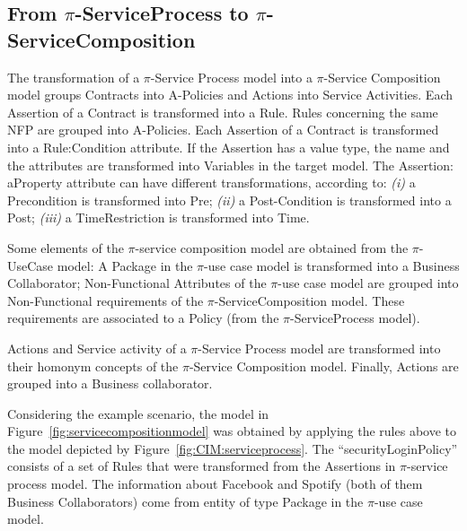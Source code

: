 \documentclass{singlecol-new}
\theoremstyle{TH}{
\newtheorem{lemma}{Lemma}
\newtheorem{theorem}[lemma]{Theorem}
\newtheorem{corrolary}[lemma]{Corrolary}
\newtheorem{conjecture}[lemma]{Conjecture}
\newtheorem{proposition}[lemma]{Proposition}
\newtheorem{claim}[lemma]{Claim}
\newtheorem{stheorem}[lemma]{Wrong Theorem}
\newtheorem{algorithm}{Algorithm}
}
\theoremstyle{THrm}{
\newtheorem{definition}{Definition}[section]
\newtheorem{question}{Question}[section]
\newtheorem{remark}{Remark}
\newtheorem{scheme}{Scheme}
}
\theoremstyle{THhit}{
\newtheorem{case}{Case}[section]
}
\theoremstyle{THhsl}{
\newtheorem{example}{Example}
}
\begin{document}
\subsection{From $\pi$-ServiceProcess to $\pi$-ServiceComposition}


The transformation  of a  $\pi$-Service Process model into a $\pi$-Service Composition model groups {\sf Contracts} into {\sf A-Policies} and {\sf Actions} into {\sf Service Activities}.   
Each {\sf Assertion} of a {\sf Contract} is transformed into a {\sf Rule}. 
{\sf Rules}  concerning the same NFP  are grouped into {\sf A-Policies}. 
Each {\sf Assertion} of a {\sf Contract} is transformed into a {\sf Rule:Condition} attribute. 
If the {\sf Assertion} has a value type, the name and the attributes are transformed into {\sf Variables} in the target model.  
The {\sf Assertion: aProperty} attribute can have different transformations, according to: 
\textit{(i)} a {\sf Precondition} is transformed into {\sf Pre};
\textit{(ii)} a {\sf Post-Condition} is transformed into a {\sf  Post};
\textit{(iii)} a {\sf TimeRestriction} is transformed into {\sf Time}.

Some elements of the $\pi$-service composition model are obtained from the $\pi$-UseCase model: 
A {\sf Package} in the $\pi$-use case model is transformed into a {\sf Business Collaborator};
\textsf{Non-Functional Attributes} of the $\pi$-use case model are grouped into \textsf{Non-Functional requirements} of the $\pi$-ServiceComposition model. 
These requirements are associated to a \textsf{Policy} (from the $\pi$-ServiceProcess model).


{\sf Actions} and {\sf Service activity} of a $\pi$-Service Process model are transformed into their hom\-onym concepts of the $\pi$-Service Composition model.
Finally, {\sf Actions} are grouped into  a {\sf Business collaborator}.


\begin{example}\label{ex:toPublicMusicT5}
Considering the example scenario, the model in Figure~\ref{fig:servicecompositionmodel} was obtained by applying the rules above to the model depicted by Figure~\ref{fig:CIM:serviceprocess}.  
The ``securityLoginPolicy'' consists of a set of {\sf Rules} that were transformed from the {\sf Assertions} in $\pi$-service process model. 
The information about Facebook and Spotify (both of them {\sf Business Collaborators}) come from entity of type {\sc Package} in the $\pi$-use case
model.
\end{example}
\end{document}
